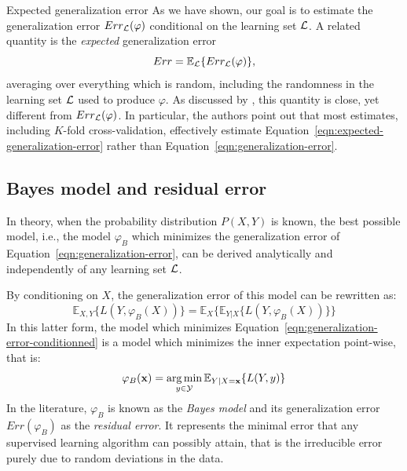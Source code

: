 \begin{remark}{Expected generalization error}
As we have shown, our goal is to estimate the generalization error $Err_{\cal
L}(\varphi)$ conditional on the learning set ${\cal L}$. A related quantity
is the \textit{expected} generalization error
\begin{equation}\label{eqn:expected-generalization-error}
Err = \mathbb{E}_{\cal L} \{ Err_{\cal L}(\varphi) \},
\end{equation}
averaging over everything which is random, including the randomness in the
learning set ${\cal L}$ used to produce $\varphi$. As discussed by
\citet{hastie:2005}, this quantity is close, yet different from $Err_{\cal
L}(\varphi)$. In particular, the authors point out that most estimates, including $K$-fold
cross-validation, effectively estimate
Equation~\ref{eqn:expected-generalization-error} rather than
Equation~\ref{eqn:generalization-error}.
\end{remark}

\subsection{Bayes model and residual error}
\label{sec:2:bayes-model}

In theory, when the probability distribution $P(X, Y)$ is known, the best possible model,
i.e., the model $\varphi_B$ which minimizes the generalization error of
Equation~\ref{eqn:generalization-error}, can be derived analytically and
independently of any learning set ${\cal L}$.

By conditioning on $X$, the generalization error of this model can be rewritten as:
\begin{equation}\label{eqn:generalization-error-conditionned}
\mathbb{E}_{X, Y}\{ L(Y, \varphi_B(X)) \} = \mathbb{E}_{X}\{ \mathbb{E}_{Y|X} \{ L(Y, \varphi_B(X)) \} \}
\end{equation}
In this latter form, the model which minimizes
Equation~\ref{eqn:generalization-error-conditionned} is a model which
minimizes the inner expectation point-wise, that is:
\begin{equation}
\varphi_B(\mathbf{x}) = \operatorname*{arg\,min}_{y \in {\cal Y}} \mathbb{E}_{Y|X=\mathbf{x}} \{ L(Y, y) \}
\end{equation}
In the literature, $\varphi_B$ is known as the \textit{Bayes model} and its
generalization error $Err(\varphi_B)$ as the \textit{residual error}. It represents the minimal
error that any supervised learning algorithm can possibly attain, that is
the irreducible error purely due to random deviations in the data.

